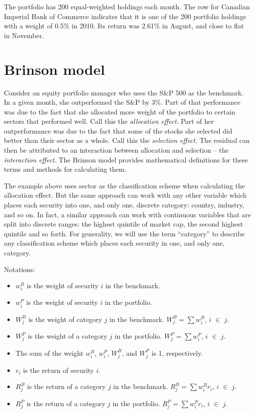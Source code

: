 The portfolio has 200 equal-weighted holdings each month. The row 
for Canadian Imperial Bank of Commerce indicates that it is one of the 200
portfolio holdings with a weight of 0.5\% in 2010. Its return was
2.61\% in August, and close to flat in November.

\section{Brinson model}

Consider an equity portfolio manager who uses the S\&P 500 as the
benchmark. In a given month, she outperformed the S\&P by 3\%. Part of
that performance was due to the fact that she allocated more weight of
the portfolio to certain sectors that performed well. Call this the
\emph{allocation effect}. Part of her outperformance was due to the
fact that some of the stocks she selected did better than their sector
as a whole. Call this the \emph{selection effect}. The residual can
then be attributed to an interaction between allocation and selection
-- the \emph{interaction effect}. The Brinson model provides
mathematical definitions for these terms and methods for calculating
them.

The example above uses sector as the classification scheme when
calculating the allocation effect. But the same approach can work with
any other variable which places each security into one, and only one,
discrete category: country, industry, and so on. In fact, a similar
approach can work with continuous variables that are split into
discrete ranges: the highest quintile of market cap, the second
highest quintile and so forth. For generality, we will use the term
``category'' to describe any classification scheme which places each
security in one, and only one, category.

Notations:


\begin{itemize}

\item $w^B_i$ is the weight of security $i$ in the benchmark.
\item $w^P_i$ is the weight of security $i$ in the portfolio.
\item $W^B_j$ is the weight of category $j$ in the benchmark. $W^B_j
  = \sum w^B_i$, $i$ $\in$ $j$.
\item $W^P_j$ is the weight of a category $j$ in the portfolio. $W^P_j
  = \sum w^P_i$, $i$ $\in$ $j$.
\item The sum of the weight $w^B_i$, $w^P_i$, $W^B_j$, and $W^P_j$ is 1, respectively.
  \item $r_i$ is the return of security $i$.
\item $R^B_j$ is the return of a category $j$ in the benchmark. $R^B_j
  = \sum w^B_ir_i$, $i$ $\in$ $j$.
\item $R^P_j$ is the return of a category $j$ in the portfolio. $R^P_j
  = \sum w^P_ir_i$, $i$ $\in$ $j$.
\end{itemize}


